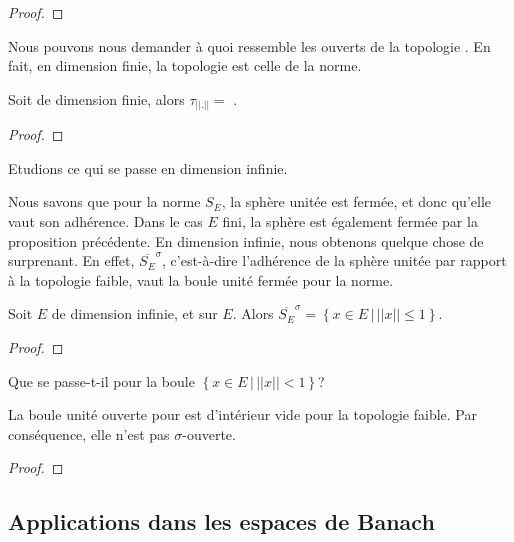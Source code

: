 \begin{proof}
	
\end{proof}

Nous pouvons nous demander à quoi ressemble les ouverts de la topologie
. En fait, en dimension finie, la topologie est celle de la norme.

\begin{proposition}
	Soit  de dimension finie, alors $\tau_{||.||}
	=$ .
\end{proposition}

\begin{proof}
	
\end{proof}

Etudions ce qui se passe en dimension infinie.

Nous savons que pour la norme $S_{E}$, la sphère unitée est fermée, et donc
qu'elle vaut son adhérence.  Dans le cas $E$ fini, la sphère est également
fermée par la proposition précédente. En dimension infinie, nous obtenons
quelque chose de surprenant. En effet, $\overline{S_{E}}^{\sigma}$, c'est-à-dire
l'adhérence de la sphère unitée par rapport à la topologie faible, vaut la boule
unité fermée pour la norme.

\begin{proposition}
	Soit $E$ de dimension infinie, et  sur $E$. Alors
	$\overline{S_{E}}^{\sigma} = \left\{ x \in E \, | \, ||x|| \leq 1 \right\}$.
\end{proposition}

\begin{proof}
	
\end{proof}

Que se passe-t-il pour la boule $\left\{ x \in E \, | \, ||x|| < 1 \right\}$?

\begin{proposition}
	La boule unité ouverte pour  est d'intérieur vide pour la
	topologie faible. Par conséquence, elle n'est pas $\sigma$-ouverte.
\end{proposition}

\begin{proof}
	
\end{proof}

\subsection{Applications dans les espaces de Banach}

